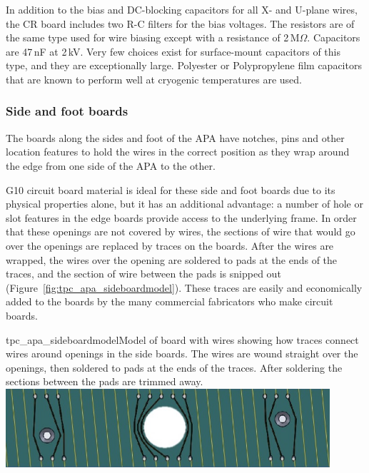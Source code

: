 
In addition to the bias and DC-blocking capacitors for all X- and U-plane wires, the CR board includes two R-C filters for the bias voltages. The resistors are of the same type used for wire biasing except with a resistance of 2\,M$\Omega$. Capacitors are 47\,nF at 2\,kV. Very few choices exist for surface-mount capacitors of this type, and they are exceptionally large. %
Polyester or Polypropylene film capacitors that are known to perform well at cryogenic temperatures are used.


\subsubsection{Side and foot boards}

The boards along the sides and foot of the APA have notches, pins and other location features to hold the wires in the correct position as they wrap around the edge from one side of the APA to the other.

G10 circuit board material is ideal for these side and foot boards due to its physical properties alone, but it has an additional advantage: a number of hole or slot features in the edge boards provide access to the underlying frame.  In order that these openings are not covered by wires, the sections of wire that would go over the openings are replaced by traces on the boards.  After the wires are wrapped, the wires over the opening are soldered to pads at the ends of the traces, and the section of wire between the pads is snipped out (Figure~\ref{fig:tpc_apa_sideboardmodel}).  These traces are easily and economically added to the boards by the many commercial fabricators who make circuit boards. 

\begin{cdrfigure}{tpc_apa_sideboardmodel}{Model of board with wires showing how traces connect wires around openings in the side boards.  The wires are wound straight over the openings, then soldered to pads at the ends of the traces.  After soldering the sections between the pads are trimmed away.}
\includegraphics[width=0.9\textwidth]{figures/tpc_apa_sideboardmodel.png} 
\end{cdrfigure}



